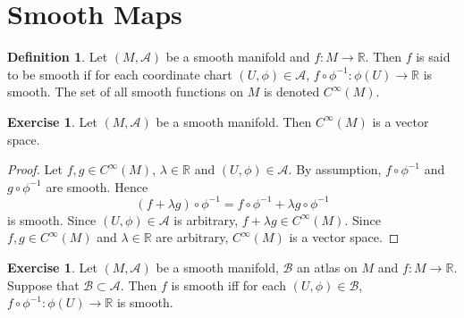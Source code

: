 \documentclass{book}
\theoremstyle{definition}
\newtheorem{defn}[definition]{Definition}
\newtheorem{ex}[definition]{Exercise}
\newcommand{\lam}{\lambda}
\newcommand{\R}{\mathbb{R}}
\newcommand{\MA}{\mathcal{A}}
\newcommand{\MB}{\mathcal{B}}
\newcommand{\ld}[1]{\label{defn:#1}}
\DeclareMathOperator*{\0}{\mbf{0}}
\DeclareMathOperator*{\1}{\mbf{1}}
\begin{document}
	
	
	
	
	
	
	
	
	
	
	

	
	
	
	
	
	
	
	
	
	
	
	
	
	
	
	
	\newpage 
	\section{Smooth Maps}	
	
	\begin{defn} \ld{42001}
		Let $(M, \MA)$ be a smooth manifold and $f: M \rightarrow \R$. Then $f$ is said to be smooth if for each coordinate chart $(U, \phi) \in \MA$, $f \circ \phi^{-1}: \phi(U) \rightarrow \R$ is smooth. The set of all smooth functions on $M$ is denoted $C^{\infty}(M)$. 
	\end{defn}

	\begin{ex} \ld{42002}
		Let $(M, \MA)$ be a smooth manifold. Then $C^{\infty}(M)$ is a vector space.
	\end{ex}

	\begin{proof}
		Let $f,g \in C^{\infty}(M)$, $\lam \in \R$ and $(U, \phi) \in \MA$. By assumption, $f \circ \phi^{-1}$ and $g \circ \phi^{-1}$ are smooth. Hence 
		$$(f + \lam g) \circ \phi^{-1} = f \circ \phi^{-1} + \lam g \circ \phi^{-1} $$
		is smooth. Since $(U, \phi) \in \MA$ is arbitrary, $f + \lam g \in C^{\infty}(M)$. Since $f,g \in C^{\infty}(M)$ and $\lam \in \R$ are arbitrary, $C^{\infty}(M)$ is a vector space.
	\end{proof}

	\begin{ex}
		Let $(M, \MA)$ be a smooth manifold, $\MB$ an atlas on $M$ and $f:M \rightarrow \R$. Suppose that $\MB \subset \MA$. Then $f$ is smooth iff for each $(U, \phi) \in \MB$, $f \circ \phi^{-1}: \phi(U) \rightarrow \R$ is smooth.
	\end{ex}
\end{document}
